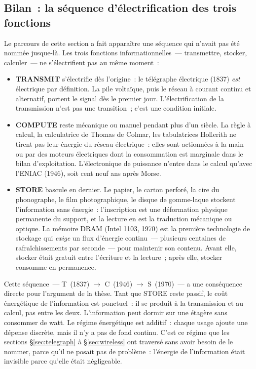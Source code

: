 \subsection{Bilan~: la séquence d'électrification des trois fonctions}\label{subsec:bilan_electrification}

%
Le parcours de cette section a fait apparaître une séquence qui n'avait pas été nommée jusque-là. Les trois fonctions informationnelles~--- transmettre, stocker, calculer~--- ne s'électrifient pas au même moment~:

\begin{itemize}
\item \textbf{TRANSMIT} s'électrifie dès l'origine~: le télégraphe électrique (1837) \emph{est} électrique par définition. La pile voltaïque, puis le réseau à courant continu et alternatif, portent le signal dès le premier jour. L'électrification de la transmission n'est pas une transition~; c'est une condition initiale.

\item \textbf{COMPUTE} reste mécanique ou manuel pendant plus d'un siècle. La règle à calcul, la calculatrice de Thomas de Colmar, les tabulatrices Hollerith ne tirent pas leur énergie du réseau électrique~: elles sont actionnées à la main ou par des moteurs électriques dont la consommation est marginale dans le bilan d'exploitation. L'électronique de puissance n'entre dans le calcul qu'avec l'ENIAC (1946), soit cent neuf ans après Morse.

\item \textbf{STORE} bascule en dernier. Le papier, le carton perforé, la cire du phonographe, le film photographique, le disque de gomme-laque stockent l'information sans énergie~: l'inscription est une déformation physique permanente du support, et la lecture en est la traduction mécanique ou optique. La mémoire DRAM (Intel 1103, 1970) est la première technologie de stockage qui \emph{exige} un flux d'énergie continu~--- plusieurs centaines de rafraîchissements par seconde~--- pour maintenir son contenu. Avant elle, stocker était gratuit entre l'écriture et la lecture~; après elle, stocker consomme en permanence.
\end{itemize}

%
Cette séquence~--- T~(1837) $\rightarrow$ C~(1946) $\rightarrow$ S~(1970)~--- a une conséquence directe pour l'argument de la thèse. Tant que STORE reste passif, le coût énergétique de l'information est ponctuel~: il se produit à la transmission et au calcul, pas entre les deux. L'information peut dormir sur une étagère sans consommer de watt. Le régime énergétique est additif~: chaque usage ajoute une dépense discrète, mais il n'y a pas de fond continu. C'est ce régime que les sections §\ref{sec:telegraph} à §\ref{sec:wireless} ont traversé sans avoir besoin de le nommer, parce qu'il ne posait pas de problème~: l'énergie de l'information était invisible parce qu'elle était négligeable.


